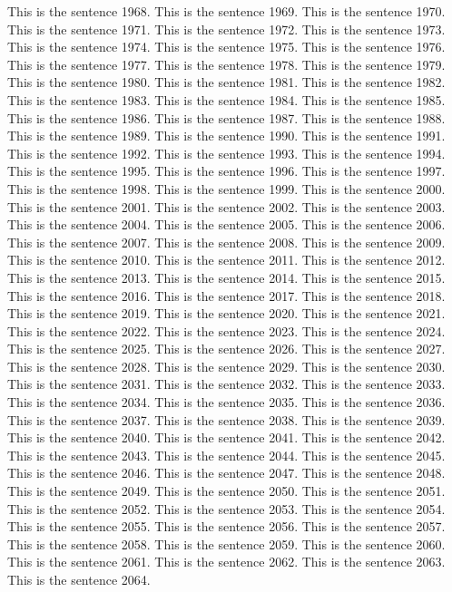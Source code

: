 \documentclass{article}
\begin{document}
This is the sentence 1968.
This is the sentence 1969.
This is the sentence 1970.
This is the sentence 1971.
This is the sentence 1972.
This is the sentence 1973.
This is the sentence 1974.
This is the sentence 1975.
This is the sentence 1976.
This is the sentence 1977.
This is the sentence 1978.
This is the sentence 1979.
This is the sentence 1980.
This is the sentence 1981.
This is the sentence 1982.
This is the sentence 1983.
This is the sentence 1984.
This is the sentence 1985.
This is the sentence 1986.
This is the sentence 1987.
This is the sentence 1988.
This is the sentence 1989.
This is the sentence 1990.
This is the sentence 1991.
This is the sentence 1992.
This is the sentence 1993.
This is the sentence 1994.
This is the sentence 1995.
This is the sentence 1996.
This is the sentence 1997.
This is the sentence 1998.
This is the sentence 1999.
This is the sentence 2000.
This is the sentence 2001.
This is the sentence 2002.
This is the sentence 2003.
This is the sentence 2004.
This is the sentence 2005.
This is the sentence 2006.
This is the sentence 2007.
This is the sentence 2008.
This is the sentence 2009.
This is the sentence 2010.
This is the sentence 2011.
This is the sentence 2012.
This is the sentence 2013.
This is the sentence 2014.
This is the sentence 2015.
This is the sentence 2016.
This is the sentence 2017.
This is the sentence 2018.
This is the sentence 2019.
This is the sentence 2020.
This is the sentence 2021.
This is the sentence 2022.
This is the sentence 2023.
This is the sentence 2024.
This is the sentence 2025.
This is the sentence 2026.
This is the sentence 2027.
This is the sentence 2028.
This is the sentence 2029.
This is the sentence 2030.
This is the sentence 2031.
This is the sentence 2032.
This is the sentence 2033.
This is the sentence 2034.
This is the sentence 2035.
This is the sentence 2036.
This is the sentence 2037.
This is the sentence 2038.
This is the sentence 2039.
This is the sentence 2040.
This is the sentence 2041.
This is the sentence 2042.
This is the sentence 2043.
This is the sentence 2044.
This is the sentence 2045.
This is the sentence 2046.
This is the sentence 2047.
This is the sentence 2048.
This is the sentence 2049.
This is the sentence 2050.
This is the sentence 2051.
This is the sentence 2052.
This is the sentence 2053.
This is the sentence 2054.
This is the sentence 2055.
This is the sentence 2056.
This is the sentence 2057.
This is the sentence 2058.
This is the sentence 2059.
This is the sentence 2060.
This is the sentence 2061.
This is the sentence 2062.
This is the sentence 2063.
This is the sentence 2064.
\end{document}
